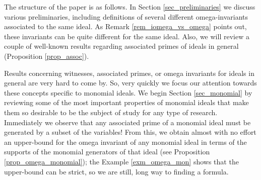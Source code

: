 \documentclass[11pt]{amsart}   %
\begin{document}
\medskip

The structure of the paper is as follows. In Section \ref{sec_preliminaries} we discuss various preliminaries, including definitions of several different omega-invariants associated to the same ideal. As Remark \ref{rem_iomega_vs_omega} points out, these invariants can be quite different for the same ideal. Also, we will review a couple of well-known results regarding associated primes of ideals in general (Proposition \ref{prop_assoc}).


Results concerning witnesses, associated primes, or omega invariants for ideals in general are very hard to come by. So, very quickly we focus our attention towards these concepts specific to monomial ideals. We begin Section \ref{sec_monomial} by reviewing some of the most important properties of monomial ideals that make them so desirable to be the subject of study for any type of research. Immediately we observe that any associated prime of a monomial ideal must be generated by a subset of the variables! From this, we obtain almost with no effort an upper-bound for the omega invariant of any monomial ideal in terms of the supports of the monomial generators of that ideal (see Proposition \ref{prop_omega_monomial}); the Example \ref{exm_omega_mon} shows that the upper-bound can be strict, so we are still, long way to finding a formula.
\end{document}
